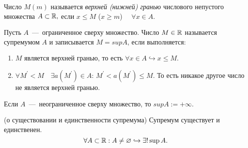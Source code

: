 \begin{definition}
        Число $M (m)$ называется \textit{верхней (нижней) гранью} числового непустого множества $A \subset \mathbb{R},$ если $x \leq M$ ($x \geq m$) $\quad \forall x \in A.$
    \end{definition}

    \begin{definition}
    \hypertarget{def1.23}{}
        Пусть $A$~---~ограниченное сверху множество. Число $M \in \mathbb{R}$ называется супремумом $A$ и записывается $M = sup A$, если выполняется:

        \begin{enumerate}
            \item $M$ является верхней гранью, то есть $\forall x \in A \hookrightarrow x \leq M$.
            \item $\forall M^{'} < M \quad \exists a(M^{'}) \in A$: $M^{'} < a(M^{'}) \leq M.$ То есть никакое другое число не является верхней гранью.
        \end{enumerate}
    \end{definition}

    \begin{definition}
        Если $A$~---~неограниченное сверху множество, то $sup A := +\infty .$
    \end{definition}

    \begin{theorem}{(о существовании и единственности супремума)} Супремум существует и единственен. $$\forall A \subset \mathbb{R}: A \neq \varnothing \hookrightarrow \exists! \sup{A}.$$
    \end{theorem}

